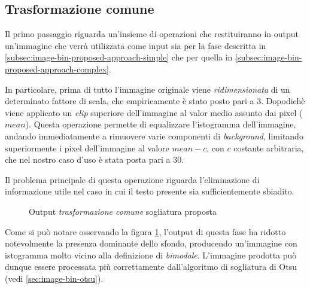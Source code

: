 \subsection{Trasformazione comune}
\label{subsec:image-bin-proposed-approach-common}
Il primo passaggio riguarda un'insieme di operazioni che restituiranno in output un'immagine che verr\`a utilizzata come input sia per la fase descritta in \ref{subsec:image-bin-proposed-approach-simple} che per quella in \ref{subsec:image-bin-proposed-approach-complex}.\par
In particolare, prima di tutto l'immagine originale viene \textit{ridimensionata} di un determinato fattore di scala, che empiricamente \`e stato posto pari a $3$. Dopodich\`e viene applicato un \textit{clip} superiore dell'immagine al valor medio assunto dai pixel ($mean$). Questa operazione permette di equalizzare l'istogramma dell'immagine, andando immediatamente a rimuovere varie componenti di \textit{background}, limitando superiormente i pixel dell'immagine al valore $mean - c$, con $c$ costante arbitraria, che nel nostro caso d'uso \`e stata posta pari a $30$.\par
Il problema principale di questa operazione riguarda l'eliminazione di informazione utile nel caso in cui il testo presente sia sufficientemente sbiadito.
\begin{figure}[h]
	\centering
	\caption{Output \textit{trasformazione comune} sogliatura proposta}
	\label{fig:image-bin-proposed-approach-common}
\end{figure}\par
Come si pu\`o notare osservando la figura \ref{fig:image-bin-proposed-approach-common}, l'output di questa fase ha ridotto notevolmente la presenza dominante dello sfondo, producendo un'immagine con istogramma molto vicino alla definizione di \textit{bimodale}. L'immagine prodotta pu\`o dunque essere processata pi\`u correttamente dall'algoritmo di sogliatura di Otsu (vedi \ref{sec:image-bin-otsu}).

